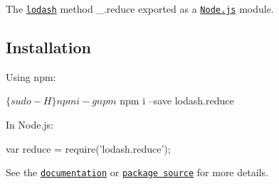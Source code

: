 The \href{https://lodash.com/}{\tt lodash} method {\ttfamily \+\_\+.\+reduce} exported as a \href{https://nodejs.org/}{\tt Node.\+js} module.

\subsection*{Installation}

Using npm\+: 
\begin{DoxyCode}
$ \{sudo -H\} npm i -g npm
$ npm i --save lodash.reduce
\end{DoxyCode}


In Node.\+js\+: 
\begin{DoxyCode}
var reduce = require('lodash.reduce');
\end{DoxyCode}


See the \href{https://lodash.com/docs#reduce}{\tt documentation} or \href{https://github.com/lodash/lodash/blob/4.6.0-npm-packages/lodash.reduce}{\tt package source} for more details. 